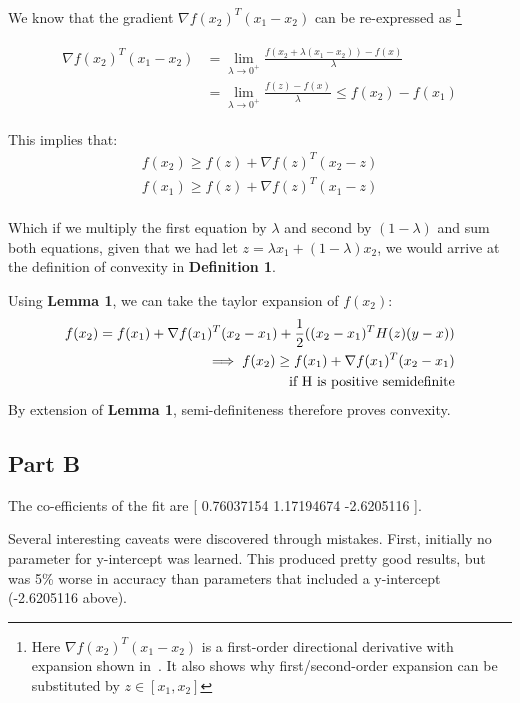 \documentclass[11pt]{article}
\begin{document}
We know that the gradient $\nabla f(x_2)^T(x_1-x_2)$ can be re-expressed as
\footnote{Here $\nabla f(x_2)^T(x_1-x_2)$ is a first-order directional derivative
with expansion shown in~\cite{directionDerivative}. It also shows why first/second-order 
expansion can be substituted by $z \in [x_1,x_2]$}

\begin{align}
	\begin{split}
		\nabla f(x_2)^T(x_1-x_2) &= \lim_{\lambda \rightarrow 0^+}\frac{f(x_2+\lambda(x_1-x_2))-f(x)}{\lambda} \\
		&= \lim_{\lambda \rightarrow 0^+}\frac{f(z)-f(x)}{\lambda} \leq f(x_2) - f(x_1)
	\end{split}
\end{align}

This implies that:
\begin{align}
	f(x_2) \geq f(z) + \nabla f(z)^T(x_2-z) \\
	f(x_1) \geq f(z) + \nabla f(z)^T(x_1-z) \\
\end{align}

Which if we multiply the first equation by $\lambda$ and second by $(1-\lambda)$ and sum 
both equations, given that we had let $z=\lambda x_1 + (1-\lambda)x_2$,  we would arrive 
at the definition of convexity in \textbf{Definition 1}.

Using \textbf{Lemma 1}, we can take the taylor expansion of $f(x_2)$:
\begin{align}
	\begin{split}
	f(x_2) = f(x_1) + \nabla f(x_1)^T(x_2-x_1) + \frac{1}{2}((x_2-x_1)^TH(z)(y-x)) \\
	\implies f(x_2) \geq f(x_1) + \nabla f(x_1)^T(x_2-x_1) \\ 
	\textnormal{if H is positive semidefinite}
	\end{split}
\end{align}
By extension of \textbf{Lemma 1}, semi-definiteness therefore proves convexity. 


\subsection*{Part B}

The co-efficients of the fit are [ 0.76037154  1.17194674 -2.6205116 ].

Several interesting caveats were discovered through mistakes. First, initially no 
parameter for y-intercept was learned. This produced pretty good results, but was 
5\% worse in accuracy than parameters that included a y-intercept (-2.6205116 above). 
\end{document}
